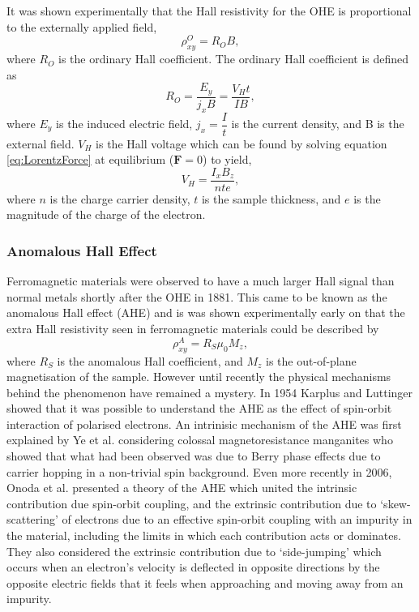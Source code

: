         It was shown experimentally that the Hall resistivity for the OHE is proportional to the externally applied field,
        \begin{equation}\label{eq:OHE}
	       \rho_{xy}^{O} = R_{O}B,
        \end{equation}
        where $R_{O}$ is the ordinary Hall coefficient. The ordinary Hall coefficient is defined as
        \begin{equation}\label{eq:OHcoeff}
	        R_{O}=\dfrac{E_{y}}{j_{x}B}=\dfrac{V_{H}t}{IB},
        \end{equation}
        where $E_{y}$ is the induced electric field, $j_{x}=\dfrac{I}{t}$ is the current density, and B is the external field. $V_{H}$ is the Hall voltage which can be found by solving equation \ref{eq:LorentzForce} at equilibrium ($\textbf{F}=0$) to yield, 
        \begin{equation}\label{eq:hallvoltage}
	        V_{H}=\dfrac{I_{x}B_{z}}{nte},
        \end{equation}
        where $n$ is the charge carrier density, $t$ is the sample thickness, and $e$ is the magnitude of the charge of the electron.

        \subsubsection{Anomalous Hall Effect}\label{subsubsec:AHE}
        Ferromagnetic materials were observed to have a much larger Hall signal than normal metals shortly after the OHE in 1881\cite{Hall1881}. This came to be known as the anomalous Hall effect (AHE) and is was shown experimentally early on that the extra Hall resistivity seen in ferromagnetic materials could be described by
        \begin{equation}\label{eq:AHE}
    	    \rho_{xy}^{A} = R_{S}\mu_{0}M_{z},
        \end{equation}
        where $R_{S}$ is the anomalous Hall coefficient, and $M_{z}$ is the out-of-plane magnetisation of the sample\cite{Pugh1953}. However until recently the physical mechanisms behind the phenomenon have remained a mystery. In 1954 Karplus and Luttinger showed that it was possible to understand the AHE as the effect of spin-orbit interaction of polarised electrons\cite{Karplus1954}. An intrinisic mechanism of the AHE was first explained by Ye et al. considering colossal magnetoresistance manganites who showed that what had been observed was due to Berry phase effects due to carrier hopping in a non-trivial spin background\cite{Ye1999}. Even more recently in 2006, Onoda et al. presented a theory of the AHE which united the intrinsic contribution due spin-orbit coupling, and the extrinsic contribution due to `skew-scattering' of electrons due to an effective spin-orbit coupling with an impurity in the material, including the limits in which each contribution acts or dominates\cite{Onoda2006}. They also considered the extrinsic contribution due to `side-jumping' which occurs  when an electron's velocity is deflected in opposite directions by the opposite electric fields that it feels when approaching and moving away from an impurity\cite{Nagaosa2010}.


